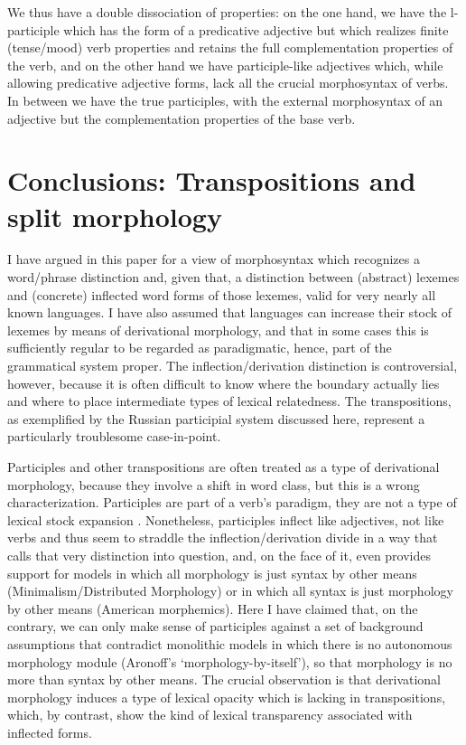 \documentclass[output=paper,
modfonts
]{LSP/langsci}
\begin{document}
We thus have a double dissociation of properties: on the one hand, we have the l-participle which has the form of a predicative adjective but which realizes finite (tense/mood) verb properties and retains the full complementation properties of the verb, and on the other hand we have participle-like adjectives which, while allowing predicative adjective forms, lack all the crucial morphosyntax of verbs. In between we have the true participles, with the external morphosyntax of an adjective but the complementation properties of the base verb. 

\section{Conclusions: Transpositions and split morphology}

\begin{sloppypar}
I have argued in this paper for a view of morphosyntax which recognizes a word/phrase distinction and, given that, a distinction between (abstract) lexemes and (concrete) inflected word forms of those lexemes, valid for very nearly all known languages. I have also assumed that languages can increase their stock of lexemes by means of derivational morphology, and that in some cases this is sufficiently regular to be regarded as  paradigmatic, hence, part of the grammatical system proper. The inflection/derivation distinction is controversial, however, because it is often difficult to know where the boundary actually lies and where to place intermediate types of lexical relatedness. The transpositions, as exemplified by the Russian participial system discussed here, represent a particularly troublesome case-in-point.\end{sloppypar}

\begin{sloppypar}
Participles and other transpositions are often treated as a type of derivational morphology, because they involve a shift in word class, but this is a wrong characterization. Participles are part of a verb’s paradigm, they are not a type of lexical stock expansion \parencite{Beard95:book}. Nonetheless, participles inflect like adjectives, not like verbs and thus seem to straddle the inflection/derivation divide in a way that calls that very distinction into question, and, on the face of it, even provides support for models in which all morphology is just syntax by other means (Minimalism/Distributed Morphology) or in which all syntax is just morphology by other means (American morphemics). Here I have claimed that, on the contrary, we can only make sense of participles against a set of background assumptions that contradict  monolithic  models in which there is no autonomous morphology module (Aronoff's `morphology-by-itself'), so that morphology is no more than syntax by other means. The crucial observation is that derivational morphology induces a type of lexical opacity which is lacking in transpositions, which, by contrast, show the kind of lexical transparency associated with inflected forms.\end{sloppypar}
\end{document}
